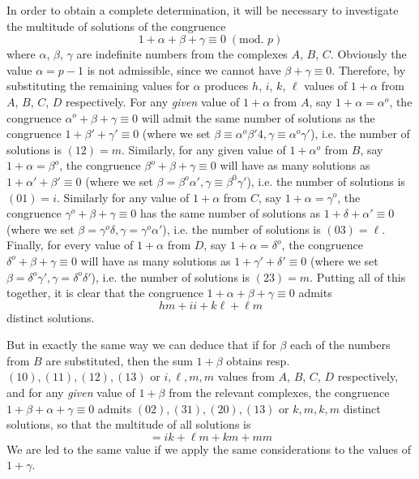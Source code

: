\documentclass{book}
\theoremstyle{plain}
\theoremstyle{remark}
\begin{document}
In order to obtain a complete determination, it will be necessary to investigate the multitude of solutions of the congruence 
\[ 1 + \alpha + \beta + \gamma \equiv 0 \; (\textrm{mod. }p) \]
where $\alpha$, $\beta$, $\gamma$ are indefinite numbers from the complexes $A$, $B$, $C$.   Obviously the value $\alpha = p-1$ is not admissible, since we cannot have $\beta + \gamma \equiv 0$.  Therefore, by substituting the remaining values for $\alpha$ produces $h$, $i$, $k$, $\ell$ values of $1 + \alpha$ from $A$, $B$, $C$, $D$ respectively.  For any \emph{given} value of $1 + \alpha$ from $A$, say $1 + \alpha = \alpha^o$, the congruence $\alpha^o + \beta + \gamma \equiv 0$ will admit the same number of solutions as the congruence $1 + \beta' + \gamma' \equiv 0$ (where we set $\beta \equiv \alpha^o\beta'4,  \gamma \equiv \alpha^o\gamma'$), i.e. the number of solutions is $(12) = m$.  Similarly, for any given value of $1 + \alpha^o$ from $B$, say $1 + \alpha = \beta^o$, the congruence $\beta^o + \beta + \gamma \equiv 0$ will have as many solutions as $1 + \alpha' + \beta' \equiv 0$ (where we set $\beta = \beta^o \alpha', \gamma \equiv \beta^0\gamma'$), i.e. the number of solutions is $(01) = i$. Similarly for any value of $1 + \alpha$ from $C$, say $1 + \alpha = \gamma^o$, the congruence $\gamma^o + \beta + \gamma \equiv 0$ has the same number of solutions as $1 + \delta + \alpha' \equiv 0$ (where we set $\beta = \gamma^o\delta, \gamma = \gamma^o \alpha'$), i.e. the number of solutions is $(03) = \ell$.  Finally, for every value of $1 + \alpha$ from $D$, say $1 + \alpha = \delta^o$, the congruence $\delta^o + \beta + \gamma \equiv 0$ will have as many solutions as $1 + \gamma' + \delta' \equiv 0$ (where we set $\beta = \delta^o\gamma', \gamma = \delta^o \delta'$), i.e. the number of solutions is $(23) = m$.  Putting all of this together, it is clear that the congruence $1 + \alpha + \beta + \gamma \equiv 0$ admits 
\[ hm + ii + k\ell + \ell m \]
distinct solutions.  

But in exactly the same way we can deduce that if for $\beta$ each of the numbers from $B$ are substituted, then the sum $1 + \beta$ obtains resp. $(10), (11), (12), (13)$ or $i, \ell, m, m$ values from $A$, $B$, $C$, $D$ respectively, and for any \emph{given} value of $ 1+ \beta$ from the relevant complexes, the congruence $1 + \beta + \alpha + \gamma \equiv 0$ admits $(02), (31), (20), (13)$ or $k, m, k, m$ distinct solutions, so that the multitude of all solutions is 
\[ = ik + \ell m + k  m + mm \]
We are led to the same value if we apply the same considerations to the values of $1 + \gamma$.  
\end{document}
